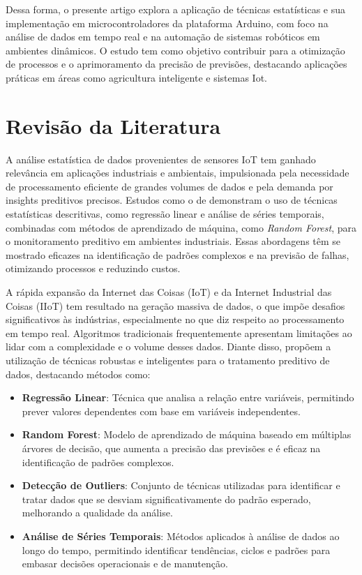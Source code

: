 \documentclass[12pt, a4paper]{article}
\begin{document}
Dessa forma, o presente artigo explora a aplicação de técnicas estatísticas e sua implementação em microcontroladores da
plataforma Arduino, com foco na análise de dados em tempo real e na automação de sistemas robóticos em ambientes
dinâmicos. O estudo tem como objetivo contribuir para a otimização de processos e o aprimoramento da precisão de
previsões, destacando aplicações práticas em áreas como agricultura inteligente e sistemas Iot.

\section{Revisão da Literatura}
\label{sec:revisao}
A análise estatística de dados provenientes de sensores IoT tem ganhado relevância em aplicações industriais e
ambientais, impulsionada pela necessidade de processamento eficiente de grandes volumes de dados e pela demanda por
insights preditivos precisos. Estudos como o de \cite{Ferencz2023} demonstram o uso de técnicas estatísticas
descritivas, como regressão linear e análise de séries temporais, combinadas com métodos de aprendizado de máquina, como
\textit{Random Forest}, para o monitoramento preditivo em ambientes industriais. Essas abordagens têm se mostrado
eficazes na identificação de padrões complexos e na previsão de falhas, otimizando processos e reduzindo custos.

A rápida expansão da Internet das Coisas (IoT) e da Internet Industrial das Coisas (IIoT) tem resultado na geração
massiva de dados, o que impõe desafios significativos às indústrias, especialmente no que diz respeito ao processamento
em tempo real. Algoritmos tradicionais frequentemente apresentam limitações ao lidar com a complexidade e o volume
desses dados. Diante disso, \cite{Ferencz2023} propõem a utilização de técnicas robustas e inteligentes para o
tratamento preditivo de dados, destacando métodos como:

\begin{itemize}
    \item \textbf{Regressão Linear}: Técnica que analisa a relação entre variáveis, permitindo prever valores dependentes com base em variáveis independentes.
    \item \textbf{Random Forest}: Modelo de aprendizado de máquina baseado em múltiplas árvores de decisão, que aumenta a precisão das previsões e é eficaz na identificação de padrões complexos.
    \item \textbf{Detecção de Outliers}: Conjunto de técnicas utilizadas para identificar e tratar dados que se desviam significativamente do padrão esperado, melhorando a qualidade da análise.
    \item \textbf{Análise de Séries Temporais}: Métodos aplicados à análise de dados ao longo do tempo, permitindo identificar tendências, ciclos e padrões para embasar decisões operacionais e de manutenção.
\end{itemize}
\end{document}
